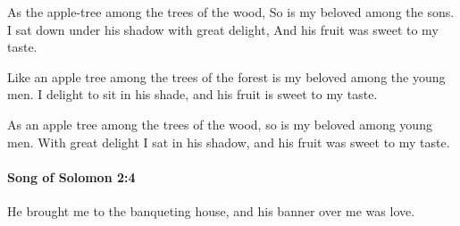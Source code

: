 			\begin{versebox}
					\item[BHS] 
					\item[LXX] 
					\item[ASV] As the apple-tree among the trees of the wood, So is my beloved among the sons. I sat down under his shadow with great delight, And his fruit was sweet to my taste.
					\item[NIV] Like an apple tree among the trees of the forest is my beloved among the young men. I delight to sit in his shade, and his fruit is sweet to my taste.
					\item[NRSV] As an apple tree among the trees of the wood, so is my beloved among young men. With great delight I sat in his shadow, and his fruit was sweet to my taste.
			\end{versebox}

		\paragraph{Song of Solomon 2:4} %
			\label{SONGOFSOLOMON-2-4}

			He brought me to the banqueting house, and his banner over me was love.

